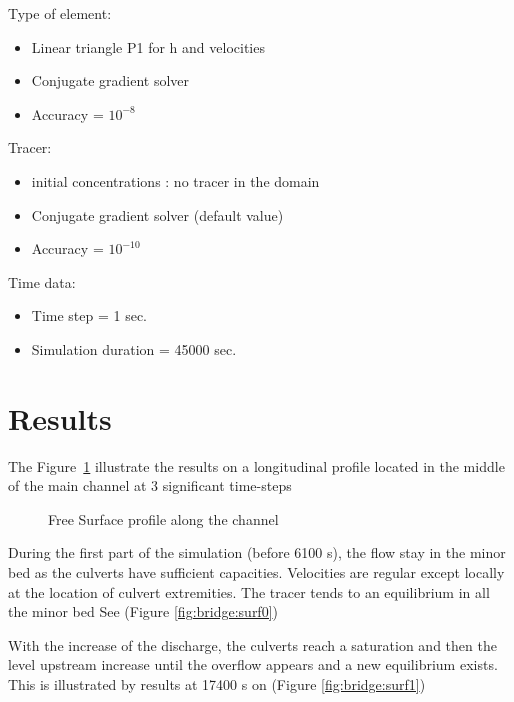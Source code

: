 Type of element:
\begin{itemize}
\item  Linear triangle P1 for h and velocities
\end{itemize}

\begin{itemize}
\item  Conjugate gradient solver
\item  Accuracy = ${10}^{-8}$
\end{itemize}

Tracer:

\begin{itemize}
\item  initial concentrations : no tracer in the domain
\item  Conjugate gradient solver (default value)
\item  Accuracy = ${10}^{-10}$
\end{itemize}

Time data:

\begin{itemize}
\item  Time step = 1 sec.
\item  Simulation duration = 45000 sec.
\end{itemize}

\section{ Results}

The Figure~\ref{fig:bridge:profile} illustrate the results on a longitudinal profile
 located in the middle of the main channel at 3 significant time-steps
\begin{figure}
\centering
{}
\caption{Free Surface profile along the channel}\label{fig:bridge:profile}
\end{figure}

During the first part of the simulation (before 6100 s), the flow stay in the minor bed 
as the culverts have sufficient capacities.
Velocities are regular except locally at the location of culvert extremities.
The tracer tends to an equilibrium in all the minor bed
See (Figure \ref{fig:bridge:surf0})

With the increase of the discharge, the culverts reach a saturation and then the level upstream
 increase until the overflow appears and a new equilibrium exists. This is illustrated
 by results at 17400 s on (Figure \ref{fig:bridge:surf1})
 
